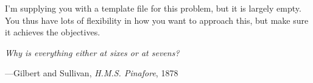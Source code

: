 \documentclass[letterpaper,12pt]{exam}
\begin{document}
\begin{questions}




	\begin{question}
	I'm supplying you with a template file for this problem, but it is largely empty. You thus have lots of flexibility in how you want to approach this, but make sure it achieves the objectives.

		\epigraph{\itshape Why is everything either at sixes or at sevens?}{---Gilbert and Sullivan, \emph{H.M.S. Pinafore}, 1878}


\end{question}
\end{questions}
\end{document}
